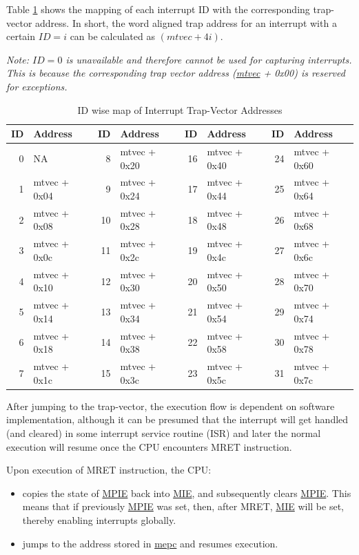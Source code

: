\documentclass[main\_\_EN.tex]{subfiles}
\begin{document}
Table \ref{tab:riscvcpu-int-isr-addr-map} shows the mapping of each interrupt ID with the corresponding trap-vector address. In short, the word aligned trap address for an interrupt with a certain $ID=i$ can be calculated as $(\hyperref[fielddesc:MTVECBASE]{mtvec} + 4i)$.

 \textit{Note: $ID=0$ is unavailable and therefore cannot be used for capturing interrupts. This is because the corresponding trap vector address (\hyperref[fielddesc:MTVECBASE]{mtvec} + 0x00) is reserved for exceptions.}

\begin{longtable}{ | r | l || r | l || r | l || r | l | }
\caption{ID wise map of Interrupt Trap-Vector Addresses} \label{tab:riscvcpu-int-isr-addr-map}
\\ \hline
\rowcolor{lightgray}
ID & Address & ID & Address & ID & Address & ID & Address \\ \hline
 0 & NA           &  8 & mtvec + 0x20 & 16 & mtvec + 0x40 & 24 & mtvec + 0x60   \\ \hline
 1 & mtvec + 0x04 &  9 & mtvec + 0x24 & 17 & mtvec + 0x44 & 25 & mtvec + 0x64   \\ \hline
 2 & mtvec + 0x08 & 10 & mtvec + 0x28 & 18 & mtvec + 0x48 & 26 & mtvec + 0x68   \\ \hline
 3 & mtvec + 0x0c & 11 & mtvec + 0x2c & 19 & mtvec + 0x4c & 27 & mtvec + 0x6c   \\ \hline
 4 & mtvec + 0x10 & 12 & mtvec + 0x30 & 20 & mtvec + 0x50 & 28 & mtvec + 0x70   \\ \hline
 5 & mtvec + 0x14 & 13 & mtvec + 0x34 & 21 & mtvec + 0x54 & 29 & mtvec + 0x74   \\ \hline
 6 & mtvec + 0x18 & 14 & mtvec + 0x38 & 22 & mtvec + 0x58 & 30 & mtvec + 0x78   \\ \hline
 7 & mtvec + 0x1c & 15 & mtvec + 0x3c & 23 & mtvec + 0x5c & 31 & mtvec + 0x7c   \\ \hline
\end{longtable}

After jumping to the trap-vector, the execution flow is dependent on software implementation, although it can be presumed that the interrupt will get handled (and cleared) in some interrupt service routine (ISR) and later the normal execution will resume once the CPU encounters MRET instruction.

Upon execution of MRET instruction, the CPU:
\begin{itemize}
    \item copies the state of \hyperref[fielddesc:MSTATUSMPIE]{MPIE} back into \hyperref[fielddesc:MSTATUSMIE]{MIE}, and subsequently clears \hyperref[fielddesc:MSTATUSMPIE]{MPIE}. This means that if previously \hyperref[fielddesc:MSTATUSMPIE]{MPIE} was set, then, after MRET, \hyperref[fielddesc:MSTATUSMIE]{MIE} will be set, thereby enabling interrupts globally.
    \item jumps to the address stored in \hyperref[regdesc:MEPC]{mepc} and resumes execution.
\end{itemize}
\end{document}
